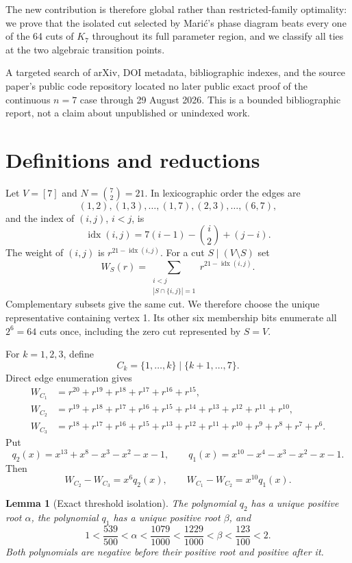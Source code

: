 \documentclass[11pt]{amsart}
\newtheorem{lemma}[theorem]{Lemma}
\theoremstyle{definition}
\begin{document}
The new contribution is therefore global rather than restricted-family
optimality: we prove that the isolated cut selected by Mari\'c's phase diagram
beats every one of the 64 cuts of $K_7$ throughout its full parameter region,
and we classify all ties at the two algebraic transition points.

A targeted search of arXiv, DOI metadata, bibliographic indexes, and the
source paper's public code repository located no later public exact proof of the
continuous $n=7$ case through 29 August 2026.  This is a bounded bibliographic
report, not a claim about unpublished or unindexed work.

\section{Definitions and reductions}

Let $V=[7]$ and $N=\binom72=21$.  In lexicographic order the edges are
\[
(1,2),(1,3),\ldots,(1,7),(2,3),\ldots,(6,7),
\]
and the index of $(i,j)$, $i<j$, is
\[
 \operatorname{idx}(i,j)=7(i-1)-\binom{i}{2}+(j-i).
\]
The weight of $(i,j)$ is $r^{21-\operatorname{idx}(i,j)}$.  For a cut
$S\mid(V\setminus S)$ set
\[
 W_S(r)=\sum_{\substack{i<j\\ |S\cap\{i,j\}|=1}}
 r^{21-\operatorname{idx}(i,j)}.
\]
Complementary subsets give the same cut.  We therefore choose the unique
representative containing vertex 1.  Its other six membership bits enumerate
all $2^6=64$ cuts once, including the zero cut represented by $S=V$.

For $k=1,2,3$, define
\[
 C_k=\{1,\ldots,k\}\mid\{k+1,\ldots,7\}.
\]
Direct edge enumeration gives
\begin{align*}
W_{C_1}&=r^{20}+r^{19}+r^{18}+r^{17}+r^{16}+r^{15},\\
W_{C_2}&=r^{19}+r^{18}+r^{17}+r^{16}+r^{15}
 +r^{14}+r^{13}+r^{12}+r^{11}+r^{10},\\
W_{C_3}&=r^{18}+r^{17}+r^{16}+r^{15}+r^{13}+r^{12}
 +r^{11}+r^{10}+r^9+r^8+r^7+r^6.
\end{align*}
Put
\[
 q_2(x)=x^{13}+x^8-x^3-x^2-x-1,
 \qquad
 q_1(x)=x^{10}-x^4-x^3-x^2-x-1.
\]
Then
\begin{equation}\label{eq:threshold-identities}
 W_{C_2}-W_{C_3}=x^6q_2(x),\qquad
 W_{C_1}-W_{C_2}=x^{10}q_1(x).
\end{equation}

\begin{lemma}[Exact threshold isolation]\label{lem:thresholds}
The polynomial $q_2$ has a unique positive root $\alpha$, the polynomial
$q_1$ has a unique positive root $\beta$, and
\[
 1<\frac{539}{500}<\alpha<\frac{1079}{1000}
 <\frac{1229}{1000}<\beta<\frac{123}{100}<2.
\]
Both polynomials are negative before their positive root and positive after
it.
\end{lemma}
\end{document}
